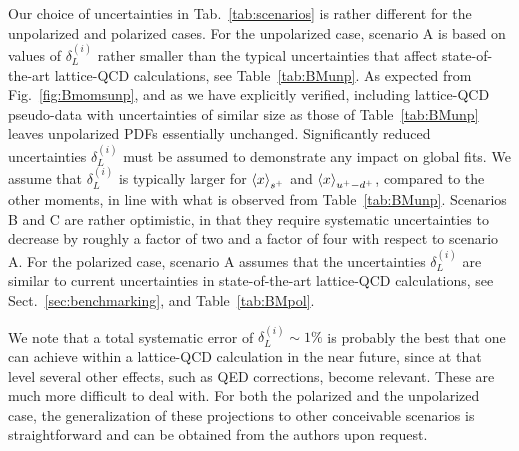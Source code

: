    
Our choice of uncertainties in Tab.~\ref{tab:scenarios}
is rather different for the unpolarized and polarized cases.
%
For the unpolarized case, scenario A is based on values
of $\delta_L^{(i)}$ rather smaller than the typical uncertainties that affect 
state-of-the-art lattice-QCD calculations, see Table~\ref{tab:BMunp}.
%
As expected from Fig.~\ref{fig:Bmomsunp}, and as we have explicitly verified,
including lattice-QCD pseudo-data with uncertainties of similar size as those 
of Table~\ref{tab:BMunp} leaves unpolarized PDFs essentially unchanged.
%
Significantly reduced uncertainties $\delta_L^{(i)}$ must be assumed to 
demonstrate any impact on global fits.
%
We assume that $\delta_L^{(i)}$ is typically larger for $\left\langle x\right\rangle_{s^+}$
and $\left\langle x\right\rangle_{u^+-d^+}$, compared to the other moments, in line with 
what is observed from Table~\ref{tab:BMunp}.
%
Scenarios B and C are rather optimistic, in that they require systematic 
uncertainties to decrease by roughly a factor of two and a factor of four 
with respect to scenario A.
%    
For the polarized case, scenario A assumes that the uncertainties 
$\delta_L^{(i)}$ are similar to current uncertainties in
state-of-the-art lattice-QCD calculations, see Sect.~\ref{sec:benchmarking},
and Table~\ref{tab:BMpol}.

We note that a total systematic error of $\delta_L^{(i)}\sim 1\%$
is probably the best that one can achieve within a lattice-QCD calculation 
in the near future, since at that level several other effects, such as QED 
corrections, become relevant. These are much more difficult to deal with.
%
For both the polarized and the unpolarized case, the generalization of these 
projections to other conceivable scenarios
is straightforward and can be obtained from the authors upon request.
 



